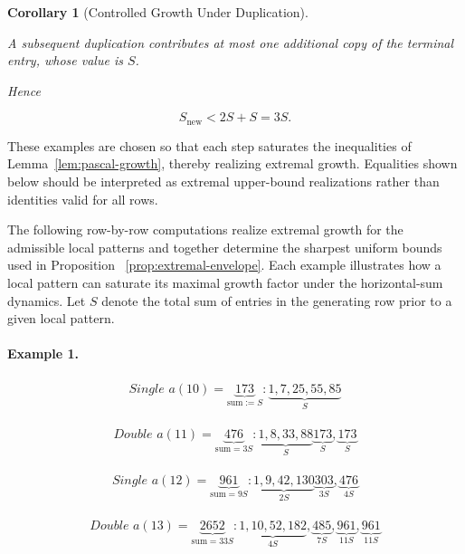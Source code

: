 \documentclass[12pt, oneside]{article}
\numberwithin{equation}{section}
\theoremstyle{definition}
\theoremstyle{plain}
\newtheorem{corollary}[theorem]{Corollary}
\theoremstyle{remark}
\begin{document}
\begin{corollary}[Controlled Growth Under Duplication]
\label{lem:controlled-growth-under-duplication}

A subsequent duplication contributes at most one additional copy of the
terminal entry, whose value is $S$.

Hence

\[
S_{\mathrm{new}}
<
2S+S
=
3S.
\]

\end{corollary}

These examples are chosen so that each step saturates the inequalities of
Lemma~\ref{lem:pascal-growth}, thereby realizing extremal growth. Equalities
shown below should be interpreted as extremal upper-bound realizations rather than
identities valid for all rows.

The following row-by-row computations realize extremal growth for the admissible
local patterns and together determine the sharpest uniform bounds used in
Proposition ~\ref{prop:extremal-envelope}.  Each example illustrates how a local pattern
can saturate its maximal growth factor under the horizontal-sum dynamics.  Let $S$
denote the total sum of entries in the generating row prior to a given local pattern.

\paragraph{Example 1.}
\[
\begin{array}{l}
\textit{Single } a(10) = \underbrace{173}_{\text{sum} := S}:
\underbrace{1,7,25,55,85}_{S}
\end{array}
\]

\[
\begin{array}{l}
\textit{Double } a(11) = \underbrace{476}_{\text{sum} = 3S}:
\underbrace{1,8,33,88}_{S}
\underbrace{173}_{S},
\underbrace{173}_{S}
\end{array}
\]

\[
\begin{array}{l}
\textit{Single } a(12) = \underbrace{961}_{\text{sum} = 9S}:
\underbrace{1,9,42,130}_{2S}
\underbrace{303}_{3S},
\underbrace{476}_{4S}
\end{array}
\]

\[
\begin{array}{l}
\textit{Double } a(13) = \underbrace{2652}_{\text{sum} = 33S}:
\underbrace{1,10,52,182}_{4S},
\underbrace{485}_{7S},
\underbrace{961}_{11S},
\underbrace{961}_{11S}
\end{array}
\]
\end{document}

